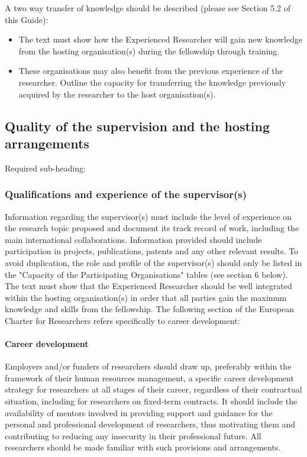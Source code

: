 \documentclass[a4paper,11pt]{article}
\begin{document}
A two way transfer of knowledge should be described (please see Section 5.2 of this Guide):
\begin{itemize}
\item The text must show how the Experienced Researcher will gain new knowledge from the hosting organisation(s) during the fellowship through training. 
\item These organisations may also benefit from the previous experience of the researcher. Outline the capacity for transferring the knowledge previously acquired by the researcher to the host organisation(s).
\end{itemize}

\subsection{Quality of the supervision and the hosting arrangements}
\label{sec:supervision}

Required sub-heading:
\subsubsection*{Qualifications and experience of the supervisor(s)}

Information regarding the supervisor(s) must include the level of experience on the research topic proposed and document its track record of work, including the main international collaborations. Information provided should include participation in projects, publications, patents and any other relevant results.
To avoid duplication, the role and profile of the supervisor(s) should only be listed in the "Capacity of the Participating Organisations" tables (see section 6 below). 
The text must show that the Experienced Researcher should be well integrated within the hosting organisation(s) in order that all parties gain the maximum knowledge and skills from the fellowship. 
The following section of the European Charter for Researchers refers specifically to career development:

\paragraph{Career development}
Employers and/or funders of researchers should draw up, preferably within the framework of their human resources management, a specific career development strategy for researchers at all stages of their career, regardless of their contractual situation, including for researchers on fixed-term contracts. It should include the availability of mentors involved in providing support and guidance for the personal and professional development of researchers, thus motivating them and contributing to reducing any insecurity in their professional future. All researchers should be made familiar with such provisions and arrangements.
\end{document}
